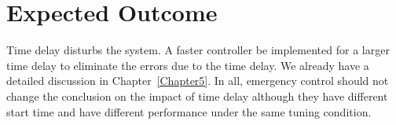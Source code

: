 \section{Expected Outcome} %
Time delay disturbs the system. A faster controller be implemented for a larger time delay to eliminate the errors due to the time delay. We already have a detailed discussion in Chapter~\ref{Chapter5}. In all, emergency control should not change the conclusion on the impact of time delay although they have different start time and have different performance under the same tuning condition. 